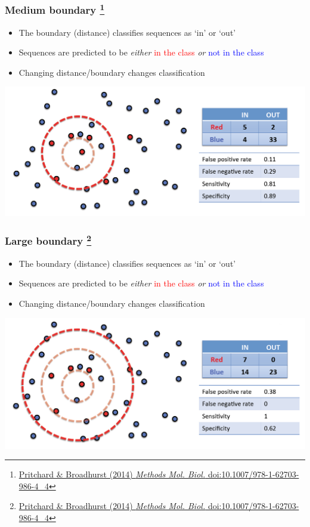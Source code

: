 \begin{frame}
  \frametitle{Medium boundary
  \footnote{\tiny{\href{http://dx.doi.org/10.1007/978-1-62703-986-4_4}{Pritchard \& Broadhurst (2014) \textit{Methods Mol. Biol.} doi:10.1007/978-1-62703-986-4\_4}}}
}
  \begin{itemize}
    \item \textcolor{hutton_green}{The boundary (distance) classifies sequences as `in' or `out'}
    \item Sequences are predicted to be \textit{either} \textcolor{red}{in the class} \textit{or} \textcolor{blue}{not in the class}
    \item \textcolor{hutton_purple}{Changing distance/boundary changes classification}
  \end{itemize}
  \includegraphics[width=1\textwidth]{images/finding_effectors9}    
\end{frame}

\begin{frame}
  \frametitle{Large boundary
  \footnote{\tiny{\href{http://dx.doi.org/10.1007/978-1-62703-986-4_4}{Pritchard \& Broadhurst (2014) \textit{Methods Mol. Biol.} doi:10.1007/978-1-62703-986-4\_4}}}
}
  \begin{itemize}
    \item \textcolor{hutton_green}{The boundary (distance) classifies sequences as `in' or `out'}
    \item Sequences are predicted to be \textit{either} \textcolor{red}{in the class} \textit{or} \textcolor{blue}{not in the class}
    \item \textcolor{hutton_purple}{Changing distance/boundary changes classification}
  \end{itemize}
  \includegraphics[width=1\textwidth]{images/finding_effectors10}    
\end{frame}

